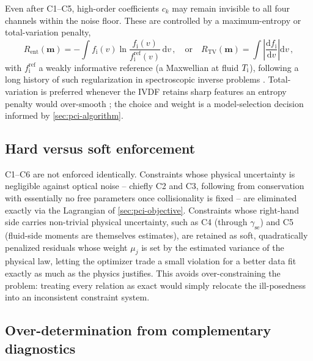 Even after C1--C5, high-order coefficients $c_{k}$ may remain invisible to all four channels within the noise floor. These are controlled by a maximum-entropy or total-variation penalty,
\begin{equation}
R_{\mathrm{ent}}(\mathbf m) = -\int f_{\mathrm i}(v)\ln\!\frac{f_{\mathrm i}(v)}{f_{\mathrm i}^{\mathrm{ref}}(v)}\,\mathrm dv \, ,\quad\text{or}\quad R_{\mathrm{TV}}(\mathbf m) = \int \left|\frac{\mathrm d f_{\mathrm i}}{\mathrm dv}\right|\mathrm dv \, , \label{eq:C6}
\end{equation}
with $f_{\mathrm i}^{\mathrm{ref}}$ a weakly informative reference (a Maxwellian at fluid $T_{\mathrm{i}}$), following a long history of such regularization in spectroscopic inverse problems \cite{ref0677}. Total-variation is preferred whenever the IVDF retains sharp features an entropy penalty would over-smooth \cite{ref0692}; the choice and weight is a model-selection decision informed by \cref{sec:pci-algorithm}.

\subsection{Hard versus soft enforcement}

C1--C6 are not enforced identically. Constraints whose physical uncertainty is negligible against optical noise -- chiefly C2 and C3, following from conservation with essentially no free parameters once collisionality is fixed -- are eliminated exactly via the Lagrangian of \cref{sec:pci-objective}. Constraints whose right-hand side carries non-trivial physical uncertainty, such as C4 (through $\gamma_{\mathrm{se}}$) and C5 (fluid-side moments are themselves estimates), are retained as soft, quadratically penalized residuals whose weight $\mu_{j}$ is set by the estimated variance of the physical law, letting the optimizer trade a small violation for a better data fit exactly as much as the physics justifies. This avoids over-constraining the problem: treating every relation as exact would simply relocate the ill-posedness into an inconsistent constraint system.

\subsection{Over-determination from complementary diagnostics}
\label{sec:pci-overdetermination}

